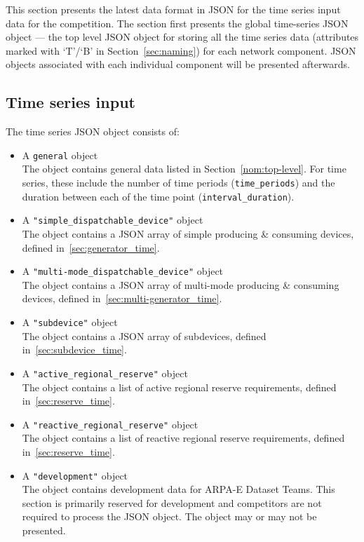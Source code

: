 \label{sec:time_series}
This section presents the latest data format in JSON for the 
time series input data for the competition.
The section first presents the global time-series JSON object --- the
top level JSON object for storing all the time series data 
(attributes marked with `T'/`B' in Section~\ref{sec:naming})
for each network component.
JSON objects associated with each individual component will be presented afterwards.


\subsection{Time series input}
\label{sec:input_data}
The time series JSON object consists of:
\begin{itemize}
    \item A \texttt{general} object\\
    The object contains general data listed
    in Section~\ref{nom:top-level}.
    For time series, these include the number of time periods (\texttt{time\_periods}) and the duration
    between each of the time point (\texttt{interval\_duration}).
    \item A \texttt{"simple\_dispatchable\_device"} object\\
    The object contains a JSON array of simple producing \& consuming devices, defined in~\ref{sec:generator_time}.
    \item A \texttt{"multi-mode\_dispatchable\_device"} object\\
    The object contains a JSON array of multi-mode producing \& consuming devices, defined in~\ref{sec:multi-generator_time}.
    \item A \texttt{"subdevice"} object\\
    The object contains a JSON array of subdevices, defined in~\ref{sec:subdevice_time}.
    \item A \texttt{"active\_regional\_reserve"} object\\
    The object contains a list of active regional reserve requirements, defined in~\ref{sec:reserve_time}.
    \item A \texttt{"reactive\_regional\_reserve"} object\\
    The object contains a list of reactive regional reserve requirements, defined in~\ref{sec:reserve_time}.    
    \item A \texttt{"development"} object\\
    The object contains development data for ARPA-E Dataset Teams. This section is primarily reserved for development and competitors are not required to process the JSON object. The object may or may not be presented. 
\end{itemize}

